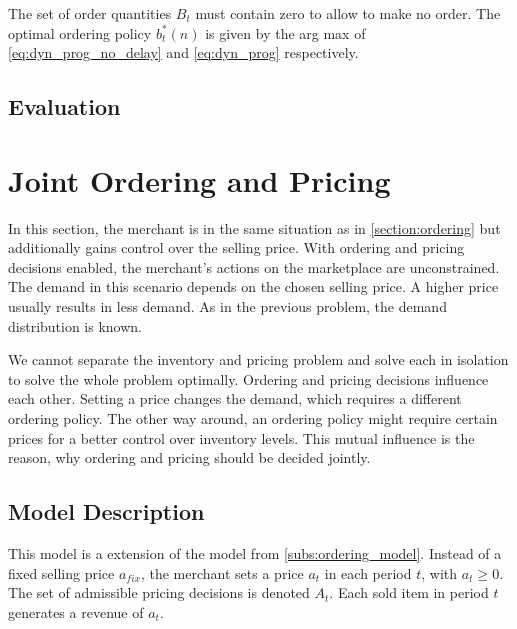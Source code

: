 The set of order quantities $B_t$ must contain zero to allow to make no order.
The optimal ordering policy $b_t^*(n)$ is given by the arg max of \cref{eq:dyn_prog_no_delay} and \cref{eq:dyn_prog} respectively. 


\subsection{Evaluation}


\section{Joint Ordering and Pricing}
In this section, the merchant is in the same situation as in \cref{section:ordering} but additionally gains control over the selling price.
With ordering and pricing decisions enabled, the merchant's actions on the marketplace are unconstrained.
The demand in this scenario depends on the chosen selling price.
A higher price usually results in less demand.
As in the previous problem, the demand distribution is known.

We cannot separate the inventory and pricing problem and solve each in isolation to solve the whole problem optimally.
Ordering and pricing decisions influence each other.
Setting a price changes the demand, which requires a different ordering policy.
The other way around, an ordering policy might require certain prices for a better control over inventory levels.
This mutual influence is the reason, why ordering and pricing should be decided jointly.

\subsection{Model Description}
This model is a extension of the model from \cref{subs:ordering_model}.
Instead of a fixed selling price $a_{fix}$, the merchant sets a price $a_t$ in each period $t$, with $a_t \geq 0$.
The set of admissible pricing decisions is denoted $A_t$.
Each sold item in period $t$ generates a revenue of $a_t$.

